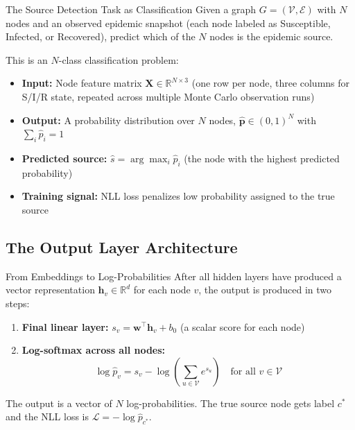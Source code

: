 \begin{conceptbox}{The Source Detection Task as Classification}
Given a graph $G = (\mathcal{V}, \mathcal{E})$ with $N$ nodes and an observed epidemic snapshot (each node labeled as Susceptible, Infected, or Recovered), predict which of the $N$ nodes is the epidemic source.

This is an $N$-class classification problem:
\begin{itemize}
    \item \textbf{Input:} Node feature matrix $\mathbf{X} \in \mathbb{R}^{N \times 3}$ (one row per node, three columns for S/I/R state, repeated across multiple Monte Carlo observation runs)
    \item \textbf{Output:} A probability distribution over $N$ nodes, $\hat{\mathbf{p}} \in (0,1)^N$ with $\sum_i \hat{p}_i = 1$
    \item \textbf{Predicted source:} $\hat{s} = \arg\max_i \hat{p}_i$ (the node with the highest predicted probability)
    \item \textbf{Training signal:} NLL loss penalizes low probability assigned to the true source
\end{itemize}
\end{conceptbox}

\subsection{The Output Layer Architecture}

\begin{conceptbox}{From Embeddings to Log-Probabilities}
After all hidden layers have produced a vector representation $\mathbf{h}_v \in \mathbb{R}^d$ for each node $v$, the output is produced in two steps:

\begin{enumerate}
    \item \textbf{Final linear layer:} $s_v = \mathbf{w}^\top \mathbf{h}_v + b_0$ (a scalar score for each node)
    \item \textbf{Log-softmax across all nodes:}
    \[
        \log \hat{p}_v = s_v - \log \!\left(\sum_{u \in \mathcal{V}} e^{s_u}\right) \quad \text{for all } v \in \mathcal{V}
    \]
\end{enumerate}

The output is a vector of $N$ log-probabilities. The true source node gets label $c^*$ and the NLL loss is $\mathcal{L} = -\log \hat{p}_{c^*}$.
\end{conceptbox}

